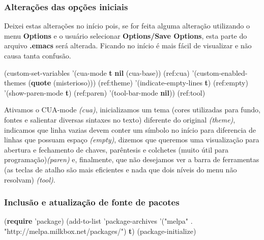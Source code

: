 \documentclass[]{article}
\newenvironment{Shaded}{}{}
\newcommand{\KeywordTok}[1]{\textcolor[rgb]{0.00,0.44,0.13}{\textbf{{#1}}}}
\newcommand{\StringTok}[1]{\textcolor[rgb]{0.25,0.44,0.63}{{#1}}}
\newcommand{\NormalTok}[1]{{#1}}
\begin{document}
\subsubsection{Alterações das opções
iniciais}\label{alterauxe7uxf5es-das-opuxe7uxf5es-iniciais}

Deixei estas alterações no início pois, se for feita alguma alteração
utilizando o menu \textbf{Options} e o usuário selecionar
\textbf{Options/Save Options}, esta parte do arquivo \textbf{.emacs}
será alterada. Ficando no início é mais fácil de visualizar e não causa
tanta confusão.

\begin{Shaded}
\begin{Highlighting}[]
\NormalTok{(custom-set-variables}
 \NormalTok{'(cua-mode }\KeywordTok{t} \KeywordTok{nil} \NormalTok{(cua-base)) (ref:cua)}
 \NormalTok{'(custom-enabled-themes (}\KeywordTok{quote} \NormalTok{(misterioso))) (ref:theme)}
 \NormalTok{'(indicate-empty-lines }\KeywordTok{t}\NormalTok{) (ref:empty)}
 \NormalTok{'(show-paren-mode }\KeywordTok{t}\NormalTok{) (ref:paren)}
 \NormalTok{'(tool-bar-mode }\KeywordTok{nil}\NormalTok{)) (ref:tool)}
\end{Highlighting}
\end{Shaded}

Ativamos o CUA-mode \emph{(cua)}, inicializamos um tema (cores
utilizadas para fundo, fontes e salientar diversas sintaxes no texto)
diferente do original \emph{(theme)}, indicamos que linha vazias devem
conter um símbolo no início para diferencia de linhas que possuam espaço
\emph{(empty)}, dizemos que queremos uma visualização para abertura e
fechamento de chaves, parêntesis e colchetes (muito útil para
programação)\emph{(paren)} e, finalmente, que não desejamos ver a barra
de ferramentas (as teclas de atalho são mais eficientes e nada que dois
níveis do menu não resolvam) \emph{(tool)}.

\subsubsection{Inclusão e atualização de fonte de
pacotes}\label{inclusuxe3o-e-atualizauxe7uxe3o-de-fonte-de-pacotes}

\begin{Shaded}
\begin{Highlighting}[]
\NormalTok{(}\KeywordTok{require} \NormalTok{'package)}
\NormalTok{(add-to-list 'package-archives}
             \NormalTok{'(}\StringTok{"melpa"} \NormalTok{. }\StringTok{"http://melpa.milkbox.net/packages/"}\NormalTok{)}
             \KeywordTok{t}\NormalTok{)}
\NormalTok{(package-initialize)}
\end{Highlighting}
\end{Shaded}
\end{document}

